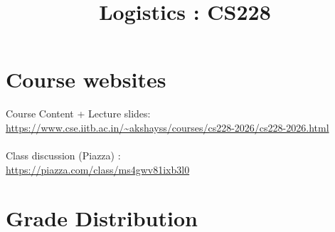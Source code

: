 \documentclass{article}
\title{Logistics : CS228}
\date{}
\begin{document}
\maketitle


\section{Course websites}
Course Content + Lecture slides: \\\url{https://www.cse.iitb.ac.in/~akshayss/courses/cs228-2026/cs228-2026.html}
\\\\
Class discussion (Piazza) : \\\url{https://piazza.com/class/ms4gwv81ixb3l0}
\pagebreak
\section{Grade Distribution}
\end{document}
